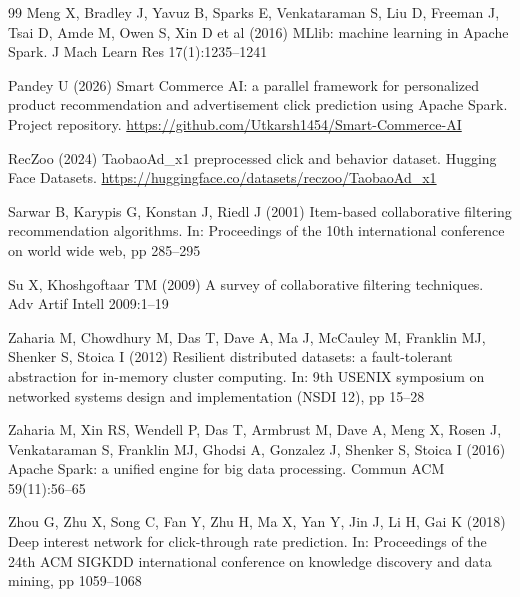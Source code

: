 \documentclass[10pt,a4paper,twoside]{article}
\begin{document}
\begin{thebibliography}{99}
Meng X, Bradley J, Yavuz B, Sparks E, Venkataraman S, Liu D, Freeman J, Tsai D, Amde M, Owen S, Xin D et al (2016) MLlib: machine learning in Apache Spark. J Mach Learn Res 17(1):1235--1241

Pandey U (2026) Smart Commerce AI: a parallel framework for personalized product recommendation and advertisement click prediction using Apache Spark. Project repository. \url{https://github.com/Utkarsh1454/Smart-Commerce-AI}

RecZoo (2024) TaobaoAd\_x1 preprocessed click and behavior dataset. Hugging Face Datasets. \url{https://huggingface.co/datasets/reczoo/TaobaoAd_x1}

Sarwar B, Karypis G, Konstan J, Riedl J (2001) Item-based collaborative filtering recommendation algorithms. In: Proceedings of the 10th international conference on world wide web, pp 285--295

Su X, Khoshgoftaar TM (2009) A survey of collaborative filtering techniques. Adv Artif Intell 2009:1--19

Zaharia M, Chowdhury M, Das T, Dave A, Ma J, McCauley M, Franklin MJ, Shenker S, Stoica I (2012) Resilient distributed datasets: a fault-tolerant abstraction for in-memory cluster computing. In: 9th USENIX symposium on networked systems design and implementation (NSDI 12), pp 15--28

Zaharia M, Xin RS, Wendell P, Das T, Armbrust M, Dave A, Meng X, Rosen J, Venkataraman S, Franklin MJ, Ghodsi A, Gonzalez J, Shenker S, Stoica I (2016) Apache Spark: a unified engine for big data processing. Commun ACM 59(11):56--65

Zhou G, Zhu X, Song C, Fan Y, Zhu H, Ma X, Yan Y, Jin J, Li H, Gai K (2018) Deep interest network for click-through rate prediction. In: Proceedings of the 24th ACM SIGKDD international conference on knowledge discovery and data mining, pp 1059--1068

\end{thebibliography}
\end{document}
